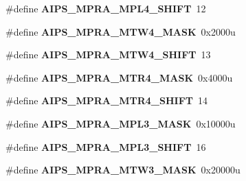 \begin{DoxyCompactItemize}
\item 
\#define {\bfseries A\+I\+P\+S\+\_\+\+M\+P\+R\+A\+\_\+\+M\+P\+L4\+\_\+\+S\+H\+I\+FT}~12\hypertarget{group__AIPS__Register__Masks_ga8e84de9fabbe7d0391efbde91421c816}{}\label{group__AIPS__Register__Masks_ga8e84de9fabbe7d0391efbde91421c816}

\item 
\#define {\bfseries A\+I\+P\+S\+\_\+\+M\+P\+R\+A\+\_\+\+M\+T\+W4\+\_\+\+M\+A\+SK}~0x2000u\hypertarget{group__AIPS__Register__Masks_gaa71c596e9889226d96760d43dc4df59c}{}\label{group__AIPS__Register__Masks_gaa71c596e9889226d96760d43dc4df59c}

\item 
\#define {\bfseries A\+I\+P\+S\+\_\+\+M\+P\+R\+A\+\_\+\+M\+T\+W4\+\_\+\+S\+H\+I\+FT}~13\hypertarget{group__AIPS__Register__Masks_ga5c44d48fc2b06c3db6d0491ceb8dfce3}{}\label{group__AIPS__Register__Masks_ga5c44d48fc2b06c3db6d0491ceb8dfce3}

\item 
\#define {\bfseries A\+I\+P\+S\+\_\+\+M\+P\+R\+A\+\_\+\+M\+T\+R4\+\_\+\+M\+A\+SK}~0x4000u\hypertarget{group__AIPS__Register__Masks_gaca05c01df65e4d0f524e055eac1bd18d}{}\label{group__AIPS__Register__Masks_gaca05c01df65e4d0f524e055eac1bd18d}

\item 
\#define {\bfseries A\+I\+P\+S\+\_\+\+M\+P\+R\+A\+\_\+\+M\+T\+R4\+\_\+\+S\+H\+I\+FT}~14\hypertarget{group__AIPS__Register__Masks_ga68f2fafe4cdcabb30910ef88b0435935}{}\label{group__AIPS__Register__Masks_ga68f2fafe4cdcabb30910ef88b0435935}

\item 
\#define {\bfseries A\+I\+P\+S\+\_\+\+M\+P\+R\+A\+\_\+\+M\+P\+L3\+\_\+\+M\+A\+SK}~0x10000u\hypertarget{group__AIPS__Register__Masks_ga4d087bd54013cebe84f39e2a7ce805f6}{}\label{group__AIPS__Register__Masks_ga4d087bd54013cebe84f39e2a7ce805f6}

\item 
\#define {\bfseries A\+I\+P\+S\+\_\+\+M\+P\+R\+A\+\_\+\+M\+P\+L3\+\_\+\+S\+H\+I\+FT}~16\hypertarget{group__AIPS__Register__Masks_ga514800328ca5057bc302a655d4b582ed}{}\label{group__AIPS__Register__Masks_ga514800328ca5057bc302a655d4b582ed}

\item 
\#define {\bfseries A\+I\+P\+S\+\_\+\+M\+P\+R\+A\+\_\+\+M\+T\+W3\+\_\+\+M\+A\+SK}~0x20000u\hypertarget{group__AIPS__Register__Masks_ga6e6b3d1dd3a2ad73b12a981e8b19b840}{}\label{group__AIPS__Register__Masks_ga6e6b3d1dd3a2ad73b12a981e8b19b840}


\end{DoxyCompactItemize}

